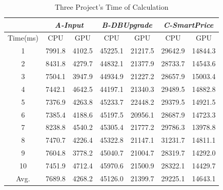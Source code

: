 \begin{table}
  \centering
  \caption{Three Project's Time of Calculation}
  \label{tab:consuming}
  \begin{tabular}{ccc|cc|cc}
    \hline
    & \multicolumn{2}{c}{ \emph{A-Input} } & \multicolumn{2}{c}{ \emph{B-DBUpgrade} } & \multicolumn{2}{c}{ \emph{C-SmartPrice} } \\
    \hline
      Time(ms) & \hspace{.25cm} CPU \hspace{.25cm} & \hspace{.25cm} GPU \hspace{.25cm} & \hspace{.25cm} CPU \hspace{.25cm} & \hspace{.25cm} GPU \hspace{.25cm} & \hspace{.25cm} CPU \hspace{.25cm} & \hspace{.25cm} GPU \hspace{.25cm}\\
    \hline
     1 & 7991.8 & 4102.5 & 45225.1 & 21217.5 & 29642.9 & 14844.3 \\
     2 & 8431.8 & 4279.7 & 44832.1 & 21377.9 & 28733.7 & 14543.6 \\
     3 & 7504.1 & 3947.9 & 44934.9 & 21227.2 & 28657.9 & 15003.4 \\
     4 & 7442.1 & 4642.5 & 44197.1 & 21340.3 & 29489.5 & 14882.8 \\
     5 & 7376.9 & 4263.8 & 45233.7 & 22448.2 & 29379.5 & 14921.5 \\
     6 & 7385.4 & 4188.6 & 45197.5 & 20956.1 & 28687.9 & 14723.3 \\
     7 & 8238.8 & 4540.2 & 45305.4 & 21777.2 & 29786.3 & 13978.8 \\
     8 & 7470.7 & 4226.4 & 45322.8 & 21147.1 & 31231.7 & 14811.1 \\
     9 & 7604.8 & 3778.2 & 45040.7 & 21004.7 & 28319.7 & 14292.0 \\
     10  & 7451.9 & 4712.4 & 45970.6 & 21500.9 & 28322.1 & 14429.7 \\
     Avg. & 7689.8 & 4268.2 & 45126.0 & 21399.7 & 29225.1 & 14643.1 \\
    \hline
  \end{tabular}
\end{table}


